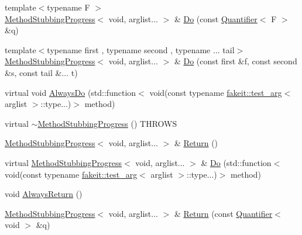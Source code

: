 \begin{DoxyCompactItemize}
{\footnotesize template$<$typename F $>$ }\\\mbox{\hyperlink{structfakeit_1_1MethodStubbingProgress}{Method\+Stubbing\+Progress}}$<$ void, arglist... $>$ \& \mbox{\hyperlink{structfakeit_1_1MethodStubbingProgress_3_01void_00_01arglist_8_8_8_01_4_a3091661d404ffecf2733281471d536c4}{Do}} (const \mbox{\hyperlink{structfakeit_1_1Quantifier}{Quantifier}}$<$ F $>$ \&q)
\item 
{\footnotesize template$<$typename first , typename second , typename ... tail$>$ }\\\mbox{\hyperlink{structfakeit_1_1MethodStubbingProgress}{Method\+Stubbing\+Progress}}$<$ void, arglist... $>$ \& \mbox{\hyperlink{structfakeit_1_1MethodStubbingProgress_3_01void_00_01arglist_8_8_8_01_4_a45b048006587b626f8220aa4b196de2a}{Do}} (const first \&f, const second \&s, const tail \&... t)
\item 
virtual void \mbox{\hyperlink{structfakeit_1_1MethodStubbingProgress_3_01void_00_01arglist_8_8_8_01_4_a3e7ae0c7da9cc0eb29d499b889805eb9}{Always\+Do}} (std\+::function$<$ void(const typename \mbox{\hyperlink{structfakeit_1_1test__arg}{fakeit\+::test\+\_\+arg}}$<$ arglist $>$\+::type...)$>$ method)
\item 
virtual \mbox{\hyperlink{structfakeit_1_1MethodStubbingProgress_3_01void_00_01arglist_8_8_8_01_4_a13f7ed59a8bd8e214f54b4a2946556ac}{$\sim$\+Method\+Stubbing\+Progress}} () T\+H\+R\+O\+WS
\item 
\mbox{\hyperlink{structfakeit_1_1MethodStubbingProgress}{Method\+Stubbing\+Progress}}$<$ void, arglist... $>$ \& \mbox{\hyperlink{structfakeit_1_1MethodStubbingProgress_3_01void_00_01arglist_8_8_8_01_4_ada79edce54db3ffaa88985829f9b5558}{Return}} ()
\item 
virtual \mbox{\hyperlink{structfakeit_1_1MethodStubbingProgress}{Method\+Stubbing\+Progress}}$<$ void, arglist... $>$ \& \mbox{\hyperlink{structfakeit_1_1MethodStubbingProgress_3_01void_00_01arglist_8_8_8_01_4_ae41031c8833fad09c16cbbc89569918b}{Do}} (std\+::function$<$ void(const typename \mbox{\hyperlink{structfakeit_1_1test__arg}{fakeit\+::test\+\_\+arg}}$<$ arglist $>$\+::type...)$>$ method)
\item 
void \mbox{\hyperlink{structfakeit_1_1MethodStubbingProgress_3_01void_00_01arglist_8_8_8_01_4_a750cd97e361c308232871da7c336e53e}{Always\+Return}} ()
\item 
\mbox{\hyperlink{structfakeit_1_1MethodStubbingProgress}{Method\+Stubbing\+Progress}}$<$ void, arglist... $>$ \& \mbox{\hyperlink{structfakeit_1_1MethodStubbingProgress_3_01void_00_01arglist_8_8_8_01_4_afbc0d4429dddcbab63de1c88176ea0f1}{Return}} (const \mbox{\hyperlink{structfakeit_1_1Quantifier}{Quantifier}}$<$ void $>$ \&q)

\end{DoxyCompactItemize}
